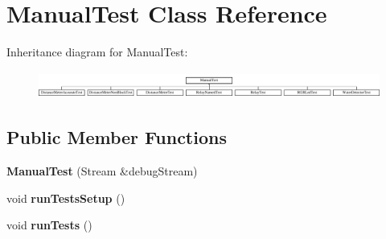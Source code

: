 \hypertarget{class_manual_test}{}\section{Manual\+Test Class Reference}
\label{class_manual_test}
Inheritance diagram for Manual\+Test\+:\begin{figure}[H]
\begin{center}
\leavevmode
\includegraphics[height=0.893855cm]{class_manual_test}
\end{center}
\end{figure}
\subsection*{Public Member Functions}
\begin{DoxyCompactItemize}
\item 
\mbox{\label{class_manual_test_aceabb8c03fd5d4f40310ed58d52f519f}} 
{\bfseries Manual\+Test} (Stream \&debug\+Stream)
\item 
\mbox{\label{class_manual_test_afdebad9843c466bcccbf74f9bc3390e6}} 
void {\bfseries run\+Tests\+Setup} ()
\item 
\mbox{\label{class_manual_test_a6d8ca4fbf873f18d9602353d41241aae}} 
void {\bfseries run\+Tests} ()
\end{DoxyCompactItemize}
